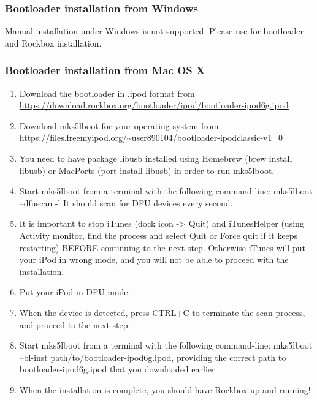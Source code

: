 
\subsubsection{Bootloader installation from Windows}

Manual installation under Windows is not supported. Please use  for bootloader and Rockbox installation.

\subsubsection{Bootloader installation from Mac OS X}


\begin{enumerate}

\item Download the bootloader in .ipod format from
\url{https://download.rockbox.org/bootloader/ipod/bootloader-ipod6g.ipod}

\item Download mks5lboot for your operating system from
\url{https://files.freemyipod.org/~user890104/bootloader-ipodclassic-v1_0}

\item You need to have package libusb installed using Homebrew (brew install
libusb) or MacPorts (port install libusb) in order to run mks5lboot.

\item Start mks5lboot from a terminal with the following command-line:
mks5lboot --dfuscan -l It should scan for DFU devices every second.

\item It is important to stop iTunes (dock icon -> Quit) and iTunesHelper
(using Activity monitor, find the process and select Quit or Force
quit if it keeps restarting) BEFORE continuing to the next
step. Otherwise iTunes will put your iPod in wrong mode, and you will
not be able to proceed with the installation.

\item Put your iPod in DFU mode.

\item When the device is detected, press CTRL+C to terminate the scan
process, and proceed to the next step.

\item Start mks5lboot from a terminal with the following command-line:
mks5lboot --bl-inst path/to/bootloader-ipod6g.ipod, providing the
correct path to bootloader-ipod6g.ipod that you downloaded earlier.

\item When the installation is complete, you should have Rockbox up and
running!

\end{enumerate}

